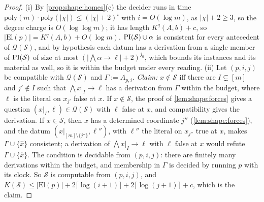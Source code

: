 \begin{proof}
(i) By \cref{prop:shape:homes}(c) the decider runs in time $\mathrm{poly}(m)\cdot\mathrm{poly}(\lvert\chi\rvert)\le(\lvert\chi\rvert+2)^i$ with $i=O(\log m)$, as $\lvert\chi\rvert+2\ge3$, so the degree charge is $O(\log\log m)$; it has length $K^q(A,b)+c$, so $\lvert\mathrm{El}(p)\rvert=K^q(A,b)+O(\log m)$. $\mathrm{PI}(\mathcal S)\cup\alpha$ is consistent for every antecedent of $\mathcal Q(\mathcal S)$, and by hypothesis each datum has a derivation from a single member of $\mathrm{PI}(\mathcal S)$ of size at most $(\lvert\bigwedge\alpha\to\ell\rvert+2)^{j_0}$, which bounds its instances and its material as well, so it is within the budget under every reading.
(ii) Let $(p,i,j)$ be compatible with $\mathcal Q(\mathcal S)$ and $\Gamma:=A_{p,i}$. \emph{Claim:} $x\notin\mathcal S$ iff there are $I\subsetneq[m]$ and $j'\notin I$ such that $\bigwedge x|_I\to\ell$ has a derivation from $\Gamma$ within the budget, where $\ell$ is the literal on $x_{j'}$ false at $x$. If $x\notin\mathcal S$, the proof of \cref{lem:shape:forces} gives a question $(x|_I,\ell)\in\mathcal Q(\mathcal S)$ with $\ell$ false at $x$, and compatibility gives the derivation. If $x\in\mathcal S$, then $x$ has a determined coordinate $j''$ (\cref{lem:shape:forces}), and the datum $(x|_{[m]\setminus\{j''\}},\ell'')$, with $\ell''$ the literal on $x_{j''}$ true at $x$, makes $\Gamma\cup\{\hat x\}$ consistent; a derivation of $\bigwedge x|_I\to\ell$ with $\ell$ false at $x$ would refute $\Gamma\cup\{\hat x\}$. The condition is decidable from $(p,i,j)$: there are finitely many derivations within the budget, and membership in $\Gamma$ is decided by running $p$ with its clock. So $\mathcal S$ is computable from $(p,i,j)$, and $K(\mathcal S)\le\lvert\mathrm{El}(p)\rvert+2\lceil\log(i+1)\rceil+2\lceil\log(j+1)\rceil+c$, which is the claim.
\end{proof}

